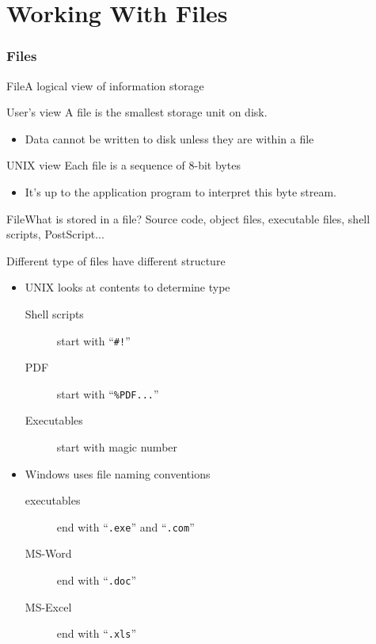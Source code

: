 \mode*
\part{Working With Files}

\section{Files}
\label{sec:file}

\begin{frame}{File}{A logical view of information storage}
  \begin{block}{User's view}
    A file is the smallest storage unit on disk.
    \begin{itemize}
    \item Data cannot be written to disk unless they are within a file
    \end{itemize}
  \end{block}
  \begin{block}{UNIX view}
    Each file is a sequence of 8-bit bytes
    \begin{itemize}
    \item It's up to the application program to interpret this byte stream.
    \end{itemize}
  \end{block}
\end{frame}

\begin{frame}{File}{What is stored in a file?}
  Source code, object files, executable files, shell scripts, PostScript...
  \begin{block}{Different type of files have different structure}
    \begin{itemize}
    \item UNIX looks at contents to determine type
      \begin{description}
      \item[Shell scripts] start with ``\texttt{\#!}''
      \item[PDF] start with ``\texttt{\%PDF...}''
      \item[Executables] start with \alert{magic number}
      \end{description}
    \item Windows uses file naming conventions
      \begin{description}
      \item[executables] end with ``\texttt{.exe}'' and ``\texttt{.com}''
      \item[MS-Word] end with ``\texttt{.doc}''
      \item[MS-Excel] end with ``\texttt{.xls}''
      \end{description}
    \end{itemize}
  \end{block}
\end{frame}

